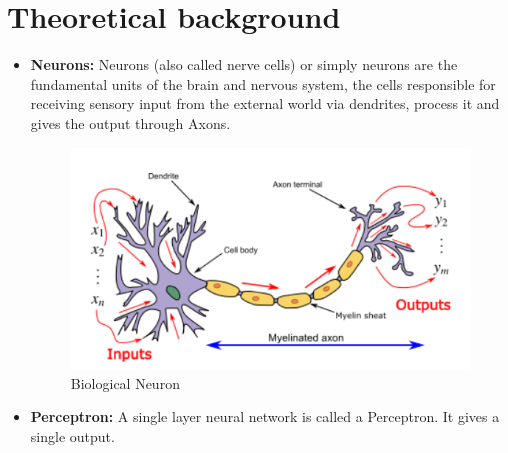 \documentclass[a4paper, 12pt]{article}
\begin{document}
\section*{Theoretical background}

\begin{itemize}

	\item \textbf{ Neurons:}	Neurons (also called nerve cells) or simply neurons are the fundamental units of the brain and nervous system, the cells responsible for receiving sensory input from the external world via dendrites, process it and gives the output through Axons. 

\begin{figure}[H]
	\begin{center}
		\includegraphics[scale=.8]{images/neuron}
		\caption{Biological Neuron \cite{towardsDataScience} }
		\label{fig:Neuron}
	\end{center}
\end{figure}


\item \textbf{ Perceptron:} A single layer neural network is called a Perceptron. It gives a single output.


\end{itemize}
\end{document}
